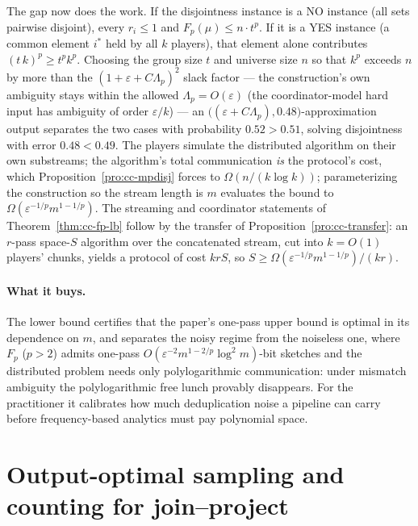 The gap now does the work. If the disjointness instance is a NO instance (all sets
pairwise disjoint), every $r_i \le 1$ and $F_p(\mu) \le n \cdot t^p$. If it is a YES
instance (a common element $i^*$ held by all $k$ players), that element alone
contributes $(t\,k)^p \ge t^p k^p$. Choosing the group size $t$ and universe size $n$
so that $k^p$ exceeds $n$ by more than the $(1 + \varepsilon + C\Lambda_p)^2$ slack
factor --- the construction's own ambiguity stays within the allowed
$\Lambda_p = O(\varepsilon)$ (the coordinator-model hard input has ambiguity of order
$\varepsilon/k$) --- an $\bigl((\varepsilon + C\Lambda_p), 0.48\bigr)$-approximation
output separates the two cases with probability $0.52 > 0.51$, solving disjointness
with error $0.48 < 0.49$. The players simulate the distributed algorithm on their own
substreams; the algorithm's total communication \emph{is} the protocol's cost, which
Proposition~\ref{pro:cc-mpdisj} forces to $\Omega(n/(k\log k))$; parameterizing the
construction so the stream length is $m$ evaluates the bound to
$\Omega(\varepsilon^{-1/p} m^{1-1/p})$. The streaming and coordinator statements of
Theorem~\ref{thm:cc-fp-lb} follow by the transfer of
Proposition~\ref{pro:cc-transfer}: an $r$-pass space-$S$ algorithm over the
concatenated stream, cut into $k = O(1)$ players' chunks, yields a protocol of cost
$k r S$, so $S \ge \Omega(\varepsilon^{-1/p} m^{1-1/p})/(k r)$.

\paragraph{What it buys.}
The lower bound certifies that the paper's one-pass upper bound is optimal in its
dependence on $m$, and separates the noisy regime from the noiseless one, where $F_p$
($p > 2$) admits one-pass $O(\varepsilon^{-2} m^{1-2/p}\log^2 m)$-bit sketches and
the distributed problem needs only polylogarithmic communication: under mismatch
ambiguity the polylogarithmic free lunch provably disappears. For the practitioner it
calibrates how much deduplication noise a pipeline can carry before frequency-based
analytics must pay polynomial space.

\section{Output-optimal sampling and counting for join--project}
\label{sec:cc-jp}

